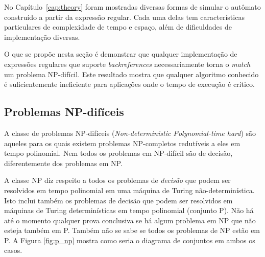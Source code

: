 \documentclass[a4paper,12pt,oneside,onecolumn]{uerj}
\begin{document}
No Capítulo~\ref{cap:theory} foram mostradas diversas formas de simular o autômato construído a partir da expressão regular. Cada uma delas tem características particulares de complexidade de tempo e espaço, além de dificuldades de implementação diversas.

O que se propõe nesta seção é demonstrar que qualquer implementação de expressões regulares que suporte \emph{backreferences} necessariamente torna o \emph{match} um problema NP-difícil. Este resultado mostra que qualquer algoritmo conhecido é suficientemente ineficiente para aplicações onde o tempo de execução é crítico.

\subsection{Problemas NP-difíceis}

A classe de problemas NP-difíceis (\emph{Non-deterministic Polynomial-time hard}) são aqueles para os quais existem problemas NP-completos redutíveis a eles em tempo polinomial. Nem todos os problemas em NP-difícil são de decisão, diferentemente dos problemas em NP.

A classe NP diz respeito a todos os problemas de \emph{decisão} que podem ser resolvidos em tempo polinomial em uma máquina de Turing não-determinística. Isto inclui também os problemas de decisão que podem ser resolvidos em máquinas de Turing determinísticas em tempo polinomial (conjunto P). Não há até o momento qualquer prova conclusiva se há algum problema em NP que não esteja também em P. Também não se sabe se todos os problemas de NP estão em P. A Figura \ref{fig:p_np} mostra como seria o diagrama de conjuntos em ambos os casos.
\end{document}
